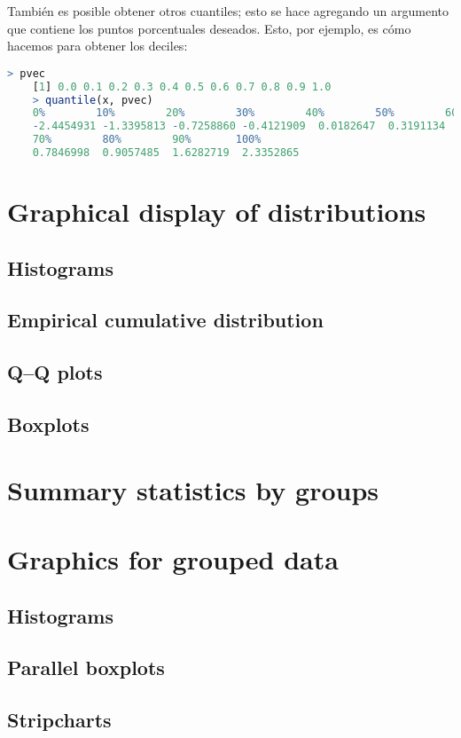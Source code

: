 También es posible obtener otros cuantiles; esto se hace agregando un argumento
que contiene los puntos porcentuales deseados. Esto, por ejemplo, es cómo
hacemos para obtener los deciles:


\begin{lstlisting}[language=R]
    > pvec
    [1] 0.0 0.1 0.2 0.3 0.4 0.5 0.6 0.7 0.8 0.9 1.0
    > quantile(x, pvec)
    0%        10%        20%        30%        40%        50%        60%
    -2.4454931 -1.3395813 -0.7258860 -0.4121909  0.0182647  0.3191134  0.6880762
    70%        80%        90%       100%
    0.7846998  0.9057485  1.6282719  2.3352865
\end{lstlisting}




\section{Graphical display of distributions}
\subsection{Histograms}
\subsection{Empirical cumulative distribution}
\subsection{Q–Q plots}\label{qqplots}
\subsection{Boxplots}
\section{Summary statistics by groups}
\section{Graphics for grouped data}
\subsection{Histograms}
\subsection{Parallel boxplots}
\subsection{Stripcharts}
